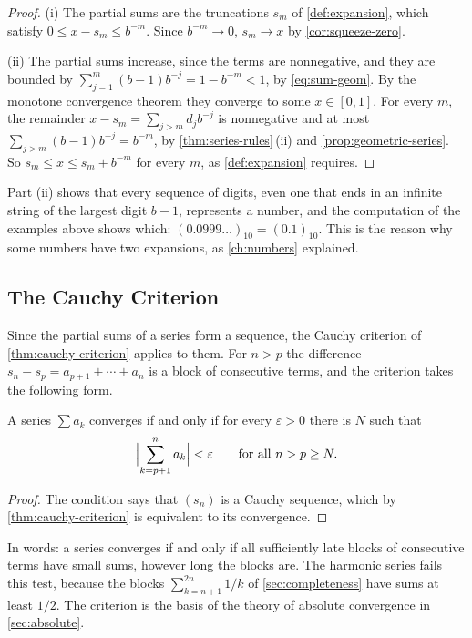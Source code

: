 \begin{proof}
(i) The partial sums are the truncations $s_m$ of \cref{def:expansion}, which satisfy $0\le x-s_m\le b^{-m}$. Since $b^{-m}\to0$, $s_m\to x$ by \cref{cor:squeeze-zero}.

(ii) The partial sums increase, since the terms are nonnegative, and they are bounded by $\sum_{j=1}^m(b-1)b^{-j}=1-b^{-m}<1$, by \eqref{eq:sum-geom}. By the monotone convergence theorem they converge to some $x\in[0,1]$. For every $m$, the remainder $x-s_m=\sum_{j>m}d_jb^{-j}$ is nonnegative and at most $\sum_{j>m}(b-1)b^{-j}=b^{-m}$, by \cref{thm:series-rules}\,(ii) and \cref{prop:geometric-series}. So $s_m\le x\le s_m+b^{-m}$ for every $m$, as \cref{def:expansion} requires.
\end{proof}

Part (ii) shows that every sequence of digits, even one that ends in an infinite string of the largest digit $b-1$, represents a number, and the computation of the examples above shows which: $(0.0999\ldots)_{10}=(0.1)_{10}$. This is the reason why some numbers have two expansions, as \cref{ch:numbers} explained.

\subsection{The Cauchy Criterion}

Since the partial sums of a series form a sequence, the Cauchy criterion of \cref{thm:cauchy-criterion} applies to them. For $n>p$ the difference $s_n-s_p=a_{p+1}+\cdots+a_n$ is a block of consecutive terms, and the criterion takes the following form.

\begin{theorem}
\label{thm:cauchy-series}
A series $\sum a_k$ converges if and only if for every $\varepsilon>0$ there is $N$ such that
\[
\Bigl|\sum_{k=p+1}^na_k\Bigr|<\varepsilon\qquad\text{for all }n>p\ge N .
\]
\end{theorem}

\begin{proof}
The condition says that $(s_n)$ is a Cauchy sequence, which by \cref{thm:cauchy-criterion} is equivalent to its convergence.
\end{proof}

In words: a series converges if and only if all sufficiently late blocks of consecutive terms have small sums, however long the blocks are. The harmonic series fails this test, because the blocks $\sum_{k=n+1}^{2n}1/k$ of \cref{sec:completeness} have sums at least $1/2$. The criterion is the basis of the theory of absolute convergence in \cref{sec:absolute}.

